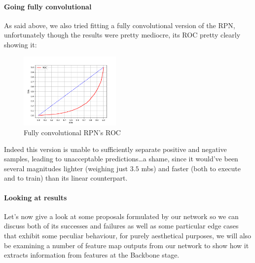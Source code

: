 \documentclass[10pt,journal,cspaper,compsoc]{IEEEtran}
\begin{document}
    \paragraph*{Going fully convolutional} As said above, we also tried fitting a fully convolutional version of the RPN, unfortunately though the results were pretty mediocre, its ROC pretty clearly showing it:

    \begin{figure}[h]
        \centering
        \includegraphics[width=0.44\textwidth]{images/ROC_conv.png}
        \caption{Fully convolutional RPN's ROC}
    \end{figure}

    Indeed this version is unable to sufficiently separate positive and negative samples, leading to unacceptable predictions\dots a shame, since it would've been several magnitudes lighter (weighing just $3.5$ mbs) and faster (both to execute and to train) than its linear counterpart.
    \paragraph*{Looking at results} Let's now give a look at some proposals formulated by our network so we can discuss both of its successes and failures as well as 
    some particular edge cases that exhibit some peculiar behaviour, for purely aesthetical purposes, we will also be examining a number of feature map outputs from our network to show how it extracts information from features at the Backbone stage.
\end{document}
